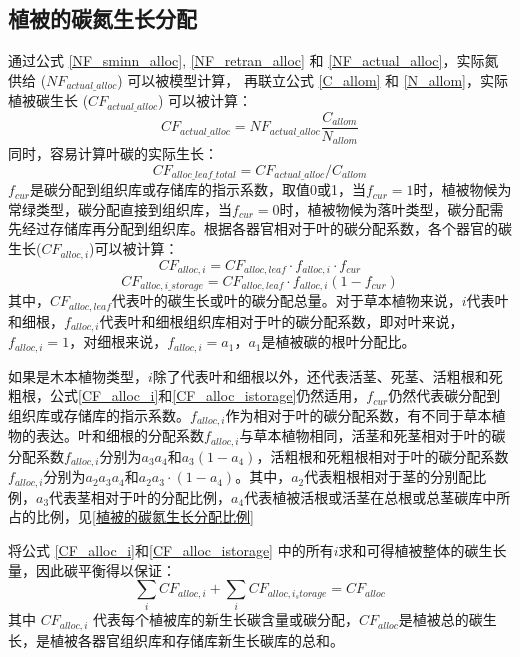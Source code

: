 \subsection{植被的碳氮生长分配}\label{植被的碳氮生长分配}
通过公式 \eqref{NF_sminn_alloc}, \eqref{NF_retran_alloc} 和 \eqref{NF_actual_alloc}，实际氮供给 ($NF_{actual\_alloc}$) 可以被模型计算，
再联立公式 \eqref{C_allom} 和 \eqref{N_allom}，实际植被碳生长 ($CF_{actual\_alloc}$) 可以被计算：
\begin{equation}
  CF_{actual\_alloc} = NF_{actual\_alloc}\frac{C_{allom}}{N_{allom}}
\end{equation}
同时，容易计算叶碳的实际生长：
\begin{equation}
  CF_{alloc\_leaf\_total} = CF_{actual\_alloc}/C_{allom}
\end{equation}
$f_{cur}$是碳分配到组织库或存储库的指示系数，取值0或1，当$f_{cur}=1$时，植被物候为常绿类型，碳分配直接到组织库，当$f_{cur}=0$时，植被物候为落叶类型，碳分配需先经过存储库再分配到组织库。根据各器官相对于叶的碳分配系数，各个器官的碳生长($CF_{alloc,i}$)可以被计算：
\begin{equation}\label{CF_alloc_i}
  CF_{alloc,i} = CF_{alloc,leaf}\cdot f_{alloc,i} \cdot f_{cur}
\end{equation}
\begin{equation}\label{CF_alloc_istorage}
  CF_{alloc,i\_storage} = CF_{alloc,leaf} \cdot f_{alloc,i} \left(1-f_{cur}\right)
\end{equation}
其中，$CF_{alloc,leaf}$代表叶的碳生长或叶的碳分配总量。对于草本植物来说，$i$代表叶和细根，$f_{alloc,i}$代表叶和细根组织库相对于叶的碳分配系数，即对叶来说，$f_{alloc,i}=1$，对细根来说，$f_{alloc,i}=a_1$，$a_1$是植被碳的根叶分配比。

如果是木本植物类型，$i$除了代表叶和细根以外，还代表活茎、死茎、活粗根和死粗根，公式\eqref{CF_alloc_i}和\eqref{CF_alloc_istorage}仍然适用，$f_{cur}$仍然代表碳分配到组织库或存储库的指示系数。$f_{alloc,i}$作为相对于叶的碳分配系数，有不同于草本植物的表达。叶和细根的分配系数$f_{alloc,i}$与草本植物相同，活茎和死茎相对于叶的碳分配系数$f_{alloc,i}$分别为$a_3a_4$和$a_3\left(1-a_4\right)$，活粗根和死粗根相对于叶的碳分配系数$f_{alloc,i}$分别为$a_2a_3a_4$和$a_2a_3\cdot \left(1-a_4\right)$。其中，$a_2$代表粗根相对于茎的分别配比例，$a_3$代表茎相对于叶的分配比例，$a_4$代表植被活根或活茎在总根或总茎碳库中所占的比例，见\ref{植被的碳氮生长分配比例}

将公式 \eqref{CF_alloc_i}和\eqref{CF_alloc_istorage} 中的所有$i$求和可得植被整体的碳生长量，因此碳平衡得以保证：
\begin{equation}
  \sum_{i}{CF_{alloc,i}}+\sum_{i}{CF_{alloc,i_storage}}=CF_{alloc}
\end{equation}
其中 $CF_{alloc,i}$ 代表每个植被库的新生长碳含量或碳分配，$CF_{alloc}$是植被总的碳生长，是植被各器官组织库和存储库新生长碳库的总和。


